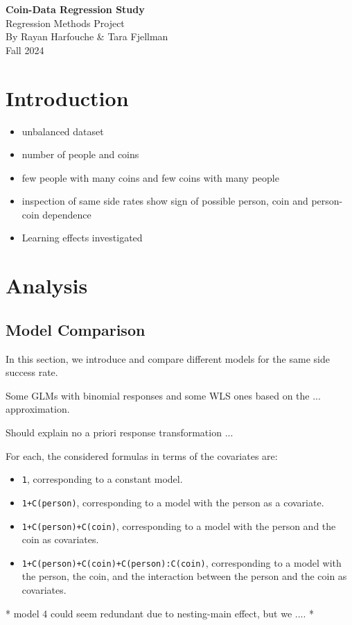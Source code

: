 \documentclass[a4paper, 12pt,oneside]{article}
\begin{document}
 
	\begin{center}
	    \Large
	    \textbf{Coin-Data Regression Study}\\
	    \large
		Regression Methods Project \\
	    By Rayan Harfouche \& Tara Fjellman \\
	    \small{Fall 2024}
	\end{center}
	\section{Introduction}
	\begin{itemize}
		\item unbalanced dataset 
		\item number of people and coins
		\item few people with many coins and few coins with many people
		\item inspection of same side rates show sign of possible person, coin and person-coin dependence
		\item Learning effects investigated 
	\end{itemize}


	\section{Analysis}
		\subsection{Model Comparison}
			In this section, we introduce and compare different models for the same side success rate. 

			Some GLMs with binomial responses and some WLS ones based on the ... approximation.
			
			Should explain no a priori response transformation ...
			
			For each, the considered formulas in terms of the covariates are:
			\begin{itemize}
				\item \texttt{1}, corresponding to a constant model.
				\item \texttt{1+C(person)}, corresponding to a model with the person as a covariate.
				\item \texttt{1+C(person)+C(coin)}, corresponding to a model with the person and the coin as covariates.
				\item \texttt{1+C(person)+C(coin)+C(person):C(coin)}, corresponding to a model with the person, the coin, and the interaction between the person and the coin as covariates.
			\end{itemize}
			* model 4 could seem redundant due to nesting-main effect, but we ....
			*  
\end{document}
